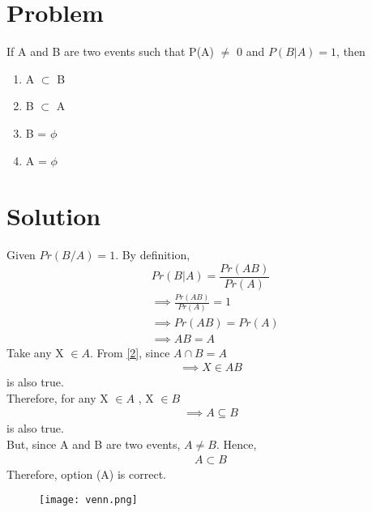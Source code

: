 \documentclass[journal,12pt,twocolumn]{IEEEtran}
\begin{document}
\section{Problem}
If A and B are two events such that P(A) $\neq$ 0
and $P(B|A) = 1$, then 
\begin{enumerate}[label={\Alph*)}]
    \item A $\subset$ B
    \item B $\subset$ A
    \item B = $\phi$ 
     \item A = $\phi$ 

\end{enumerate}
\section{Solution}

Given $Pr(B / A)=1$. By definition,
$$Pr(B|A)=\frac{Pr(AB)}{Pr(A)}$$
\begin{align}
&\implies\frac{Pr(AB)}{Pr(A)} = 1\\
&\implies Pr(AB) = Pr(A)\label{1}\\
&\implies AB= A\label{2}
\end{align}
Take any X $\in A $. From \eqref{2}, since $A\cap B= A$\\
\begin{align}
    \implies X \in AB
\end{align}is also true.\\
Therefore, for any X $\in A $ , X $\in B $
    \begin{align}
    \implies A \subseteq B 
\end{align}is also true.\\
    But, since A and B are two events, $A\neq B$. Hence,
    \begin{align}
    A \subset B
\end{align}
Therefore, option (A) is correct.
\begin{figure}[h]
    \centering
    \texttt{[image: venn.png]}
    
    \label*{Venn diagram}
\end{figure}
\end{document}

